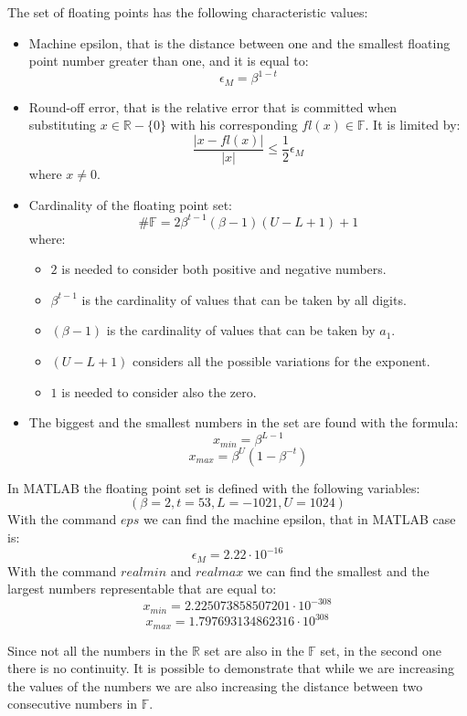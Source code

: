\documentclass[12pt, a4paper]{report}
\newtheorem[style=M,bodystyle=\normalfont]{theorem}{Theorem}
\newtheorem[style=M,bodystyle=\normalfont]{corollary}{Corollary}
\newtheorem[style=M,bodystyle=\normalfont]{lemma}{Lemma}
\newtheorem[style=M,bodystyle=\normalfont]{definition}{Definition}
\begin{document}
The set of floating points has the following characteristic values:
\begin{itemize}
    \item Machine epsilon, that is the distance between one and the smallest floating point number greater than one, and it is equal to: 
        \[\epsilon_M=\beta^{1-t}\]
    \item Round-off error, that is the relative error that is committed when substituting $x \in \mathbb{R}-\{0\}$ with his corresponding 
        $fl(x) \in \mathbb{F}$. It is limited by: 
        \[\dfrac{\left\lvert x-fl(x) \right\rvert}{\left\lvert x \right\rvert }\leq \dfrac{1}{2}\epsilon_M\]
        where $x \neq 0$.
    \item Cardinality of the floating point set:
        \[\#\mathbb{F}=2 \beta^{t-1}(\beta -1)(U-L+1)+1\]
        where: 
        \begin{itemize}
            \item $2$ is needed to consider both positive and negative numbers. 
            \item $\beta^{t-1}$ is the cardinality of values that can be taken by all digits.
            \item $(\beta -1)$ is the cardinality of values that can be taken by $a_1$.
            \item $(U-L+1)$ considers all the possible variations for the exponent.
            \item $1$ is needed to consider also the zero. 
        \end{itemize}
    \item The biggest and the smallest numbers in the set are found with the formula:
        \[x_{min}=\beta^{L-1}\]
        \[x_{max}=\beta^U(1-\beta^{-t})\]
\end{itemize}
\begin{example}
    In MATLAB the floating point set is defined with the following variables:
    \[(\beta=2,t=53,L=-1021,U=1024)\] 
    With the command $eps$ we can find the machine epsilon, that in MATLAB case is:
    \[\epsilon_M=2.22 \cdot 10^{-16}\]
    With the command $realmin$ and $realmax$ we can find the smallest and the largest numbers representable that are equal to:
    \[x_{min}=2.225073858507201 \cdot 10^{-308}\]
    \[x_{max}=1.797693134862316 \cdot 10^{308}\]
\end{example}
Since not all the numbers in the $\mathbb{R}$ set are also in the $\mathbb{F}$ set, in the second one there is no continuity. It is possible to 
demonstrate that while we are increasing the values of the numbers we are also increasing the distance between two consecutive numbers in $\mathbb{F}$.
\end{document}
